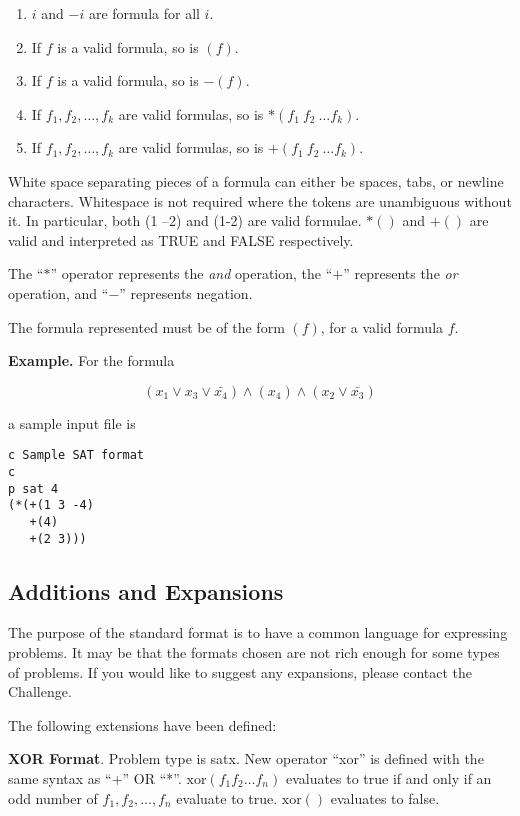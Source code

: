 \documentclass[12pt]{article}
\begin{document}
\begin{enumerate}
\item $i$ and $-i$ are formula for all $i$.
\item If $f$ is a valid formula, so is $(f)$.
\item If $f$ is a valid formula, so is $-(f)$.
\item If $f_1,f_2,\ldots,f_k$ are valid formulas, so is $*(f_1\  f_2\ \ldots f_k)$.
\item If $f_1,f_2,\ldots,f_k$ are valid formulas, so is $+(f_1\  f_2\ \ldots f_k)$.
\end{enumerate}

White space separating pieces of a formula can either be spaces, tabs,
or newline characters.  Whitespace is not required where the tokens
are unambiguous without it.  In particular, both (1 --2) and (1-2) are
valid formulae.  $*()$ and $+()$ are valid and interpreted as TRUE and
FALSE respectively.

The ``$*$'' operator represents the {\it and} operation, the ``$+$''
represents the {\it or} operation, and ``$-$'' represents negation.

The formula represented must be of the form $(f)$, for a valid formula
$f$.

\bigskip
{\bf Example.}  For the formula

$$(x_1\vee x_3\vee \bar{x_4})\wedge (x_4)\wedge (x_2\vee \bar{x_3})$$

\noindent a sample input file is

\begin{verbatim}
c Sample SAT format
c
p sat 4
(*(+(1 3 -4)
   +(4)
   +(2 3)))
\end{verbatim}

\subsection{Additions and Expansions}  The purpose of the standard
format is to have a common language for expressing problems.  It may
be that the formats chosen are not rich enough for some types of
problems.  If you would like to suggest any expansions, please contact
the Challenge.

The following extensions have been defined:

{\bf XOR Format}.  Problem type is satx.  New operator ``xor'' is
defined with the same syntax as ``+'' OR ``*''.  $\mbox{xor}(f_1 f_2
\ldots f_n)$ evaluates to true if and only if an odd number of $f_1,
f_2,\ldots, f_n$ evaluate to true.  $\mbox{xor}()$ evaluates to false.
\end{document}
